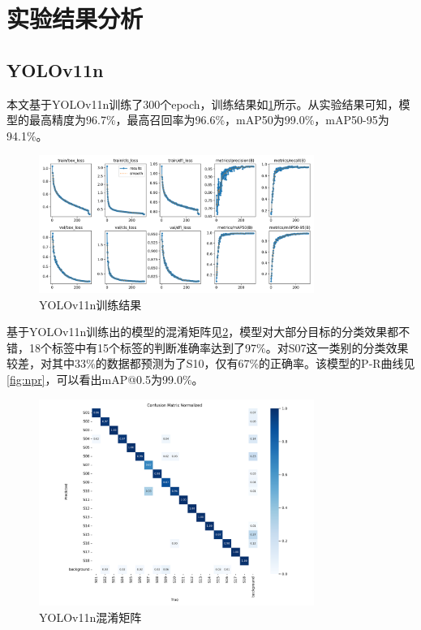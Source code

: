 \section{实验结果分析}
\subsection{YOLOv11n}
本文基于YOLOv11n训练了300个epoch，训练结果如\ref{fig:nresult}所示。从实验结果可知，模型的最高精度为96.7\%，最高召回率为96.6\%，mAP50为99.0\%，mAP50-95为94.1\%。
\begin{figure}[H]
    \centering
    \includegraphics[width=0.8\textwidth]{figs/chap04/n_results.png}
    \caption{YOLOv11n训练结果}
    \label{fig:nresult}
\end{figure}

基于YOLOv11n训练出的模型的混淆矩阵见\ref{fig:nmatrix}，模型对大部分目标的分类效果都不错，18个标签中有15个标签的判断准确率达到了97\%。对S07这一类别的分类效果较差，对其中33\%的数据都预测为了S10，仅有67\%的正确率。该模型的P-R曲线见\ref{fig:npr}，可以看出mAP@0.5为99.0\%。


\begin{figure}[H]
    \centering
    \includegraphics[width=0.8\textwidth]{figs/chap04/n_confusion_matrix_normalized.png}
    \caption{YOLOv11n混淆矩阵}
    \label{fig:nmatrix}
\end{figure}

